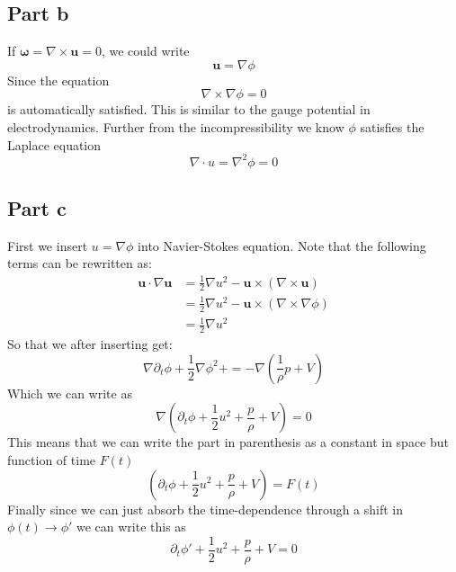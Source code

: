 \documentclass[a4paper,12pt]{article}
\begin{document}
\subsection*{Part b}
If $\bm \omega =\nabla\times \bm u =0$, we could write
\begin{equation}
\bm u=\nabla \phi
\end{equation}
Since the equation
\begin{equation}
\nabla\times \nabla\phi =0
\end{equation}
is automatically satisfied. This is similar to the gauge potential in electrodynamics. Further from the incompressibility we know $\phi$ satisfies the Laplace equation
\begin{equation}
\nabla\cdot u=\nabla^2 \phi=0
\end{equation}
\subsection*{Part c}
First we insert $u=\nabla\phi$ into Navier-Stokes equation. Note that the following terms can be rewritten as:
\begin{equation}
\begin{aligned}
\bm u \cdot \nabla\bm u&=\frac{1}{2}\nabla u^2-\bm u\times (\nabla \times \bm u)\\
&=\frac{1}{2}\nabla u^2-\bm u\times (\nabla \times \nabla\phi)\\
&=\frac{1}{2}\nabla u^2
\end{aligned}
\end{equation}
So that we after inserting get:
\begin{equation}
	\nabla \partial_t \phi+ \frac{1}{2}\nabla \phi^2+=-\nabla \left(\frac{1}{\rho} p+ V\right)
\end{equation}
Which we can write as
\begin{equation}
	\nabla \left(\partial_t \phi+\frac{1}{2} u^2+\frac{p}{\rho} + V\right)=0
\end{equation}
This means that we can write the part in parenthesis as a constant in space but function of time $F(t)$
\begin{equation}
 \left(\partial_t \phi+\frac{1}{2} u^2+\frac{p}{\rho} + V\right)=F(t)
\end{equation}
Finally since we can just absorb the time-dependence through a shift in $\phi(t)\to\phi'$ we can write this as
\begin{equation} \label{eq:flow}
\partial_t \phi'+\frac{1}{2} u^2+\frac{p}{\rho} + V=0
\end{equation}
\end{document}

